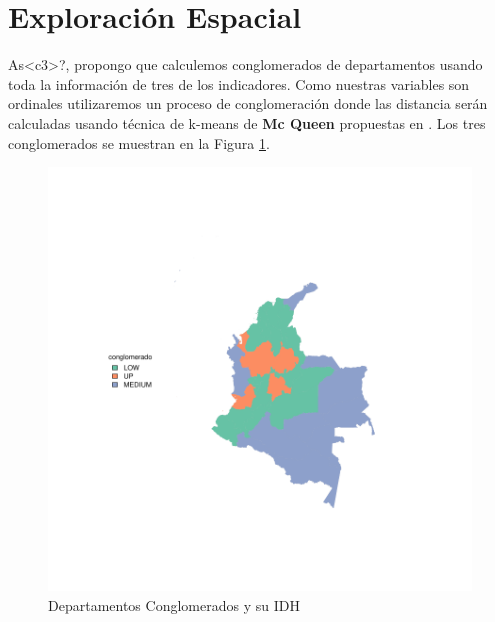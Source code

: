 \documentclass{article}
\begin{document}
\clearpage

\section{Exploración Espacial}



As<c3>?, propongo que calculemos conglomerados de departamentos usando toda la información de tres de los indicadores. Como nuestras variables son ordinales utilizaremos un proceso de conglomeración donde las distancia serán calculadas usando técnica de k-means de {\bf Mc Queen} propuestas en \cite{macqueen_methods_nodate}. Los tres conglomerados se muestran en la Figura \ref{clustmap}.







\begin{figure}[h]
\centering

\includegraphics{Entrega_final_HC-plotMap1}
\caption{Departamentos Conglomerados y su IDH}\label{clustmap}
\end{figure}


\renewcommand{\refname}{Bibliografia}

\end{document}
